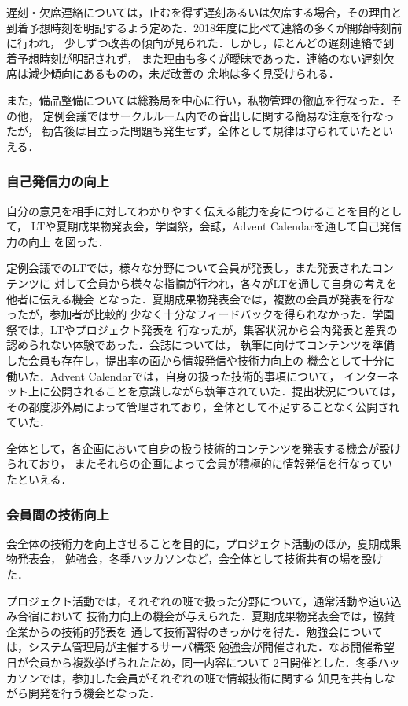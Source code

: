 遅刻・欠席連絡については，止むを得ず遅刻あるいは欠席する場合，その理由と
到着予想時刻を明記するよう定めた．2018年度に比べて連絡の多くが開始時刻前に行われ，
少しずつ改善の傾向が見られた．しかし，ほとんどの遅刻連絡で到着予想時刻が明記されず，
また理由も多くが曖昧であった．連絡のない遅刻欠席は減少傾向にあるものの，未だ改善の
余地は多く見受けられる．

また，備品整備については総務局を中心に行い，私物管理の徹底を行なった．その他，
定例会議ではサークルルーム内での音出しに関する簡易な注意を行なったが，
勧告後は目立った問題も発生せず，全体として規律は守られていたといえる．

\subsubsection*{自己発信力の向上}
自分の意見を相手に対してわかりやすく伝える能力を身につけることを目的として，
LTや夏期成果物発表会，学園祭，会誌，Advent Calendarを通して自己発信力の向上
を図った．

定例会議でのLTでは，様々な分野について会員が発表し，また発表されたコンテンツに
対して会員から様々な指摘が行われ，各々がLTを通して自身の考えを他者に伝える機会
となった．夏期成果物発表会では，複数の会員が発表を行なったが，参加者が比較的
少なく十分なフィードバックを得られなかった．学園祭では，LTやプロジェクト発表を
行なったが，集客状況から会内発表と差異の認められない体験であった．会誌については，
執筆に向けてコンテンツを準備した会員も存在し，提出率の面から情報発信や技術力向上の
機会として十分に働いた．Advent Calendarでは，自身の扱った技術的事項について，
インターネット上に公開されることを意識しながら執筆されていた．提出状況については，
その都度渉外局によって管理されており，全体として不足することなく公開されていた．

全体として，各企画において自身の扱う技術的コンテンツを発表する機会が設けられており，
またそれらの企画によって会員が積極的に情報発信を行なっていたといえる．

\subsubsection*{会員間の技術向上}
会全体の技術力を向上させることを目的に，プロジェクト活動のほか，夏期成果物発表会，
勉強会，冬季ハッカソンなど，会全体として技術共有の場を設けた．

プロジェクト活動では，それぞれの班で扱った分野について，通常活動や追い込み合宿において
技術力向上の機会が与えられた．夏期成果物発表会では，協賛企業からの技術的発表を
通して技術習得のきっかけを得た．勉強会については，システム管理局が主催するサーバ構築
勉強会が開催された．なお開催希望日が会員から複数挙げられたため，同一内容について
2日開催とした．冬季ハッカソンでは，参加した会員がそれぞれの班で情報技術に関する
知見を共有しながら開発を行う機会となった．

